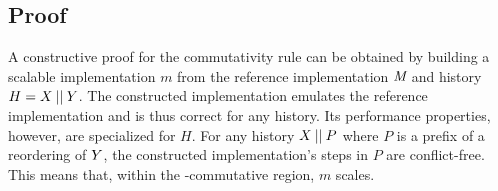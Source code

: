



\subsection{Proof}

A constructive proof for the commutativity rule can be obtained by
building a scalable
implementation $m$ from the reference implementation $\textit{M}$ and
history $H = X \mathbin{||} Y$.
%
The constructed implementation emulates the reference implementation and
is thus correct for any history. Its {performance}
properties, however, are specialized for $H$. For
any history $X\mathbin{||} P$ where $P$ is a prefix of a
reordering of $Y$, the constructed implementation's steps in $P$
are conflict-free. This means that, within the \SIM-commutative
region, $m$ scales.


